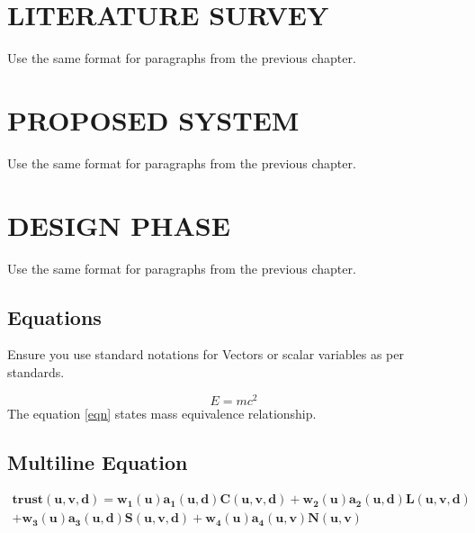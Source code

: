 \documentclass[12pt,a4paper]{report}
\begin{document}
\chapter{LITERATURE SURVEY}
\thispagestyle{fancy}
\onehalfspacing
\hspace*{1cm} Use the same format for paragraphs from the previous chapter.
\chapter{PROPOSED SYSTEM}
\thispagestyle{fancy}
\onehalfspacing
\hspace*{1cm} Use the same format for paragraphs from the previous chapter.
\chapter{DESIGN PHASE}
\thispagestyle{fancy}
\onehalfspacing
\hspace*{1cm}Use the same format for paragraphs from the previous chapter.
\section{Equations}
Ensure you use standard notations for Vectors or scalar variables as per standards.

 \begin{equation} \label{eqn}
	E = {mc^2} 
	\end{equation}
 	 The equation \ref{eqn} states mass equivalence relationship.

\section{Multiline Equation}
\begin{multline}
\mathbf{trust(u,v,d)=w_1(u)a_1(u,d)C(u,v,d)+w_2(u)a_2(u,d)L(u,v,d)} \\
\mathbf{+w_3(u)a_3(u,d)S(u,v,d)+w_4(u)a_4(u,v)N(u,v)}
\end{multline}
\end{document}
